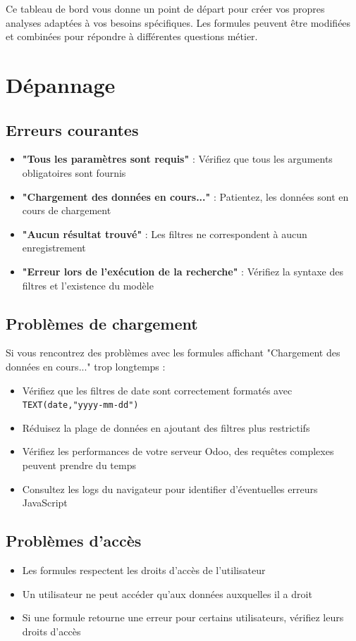 \documentclass[12pt, a4paper]{article}
\begin{document}
Ce tableau de bord vous donne un point de départ pour créer vos propres analyses adaptées à vos besoins spécifiques. Les formules peuvent être modifiées et combinées pour répondre à différentes questions métier.

\section{Dépannage}

\subsection{Erreurs courantes}
\begin{itemize}
    \item \textbf{"Tous les paramètres sont requis"} : Vérifiez que tous les arguments obligatoires sont fournis
    \item \textbf{"Chargement des données en cours..."} : Patientez, les données sont en cours de chargement
    \item \textbf{"Aucun résultat trouvé"} : Les filtres ne correspondent à aucun enregistrement
    \item \textbf{"Erreur lors de l'exécution de la recherche"} : Vérifiez la syntaxe des filtres et l'existence du modèle
\end{itemize}

\subsection{Problèmes de chargement}
Si vous rencontrez des problèmes avec les formules affichant "Chargement des données en cours..." trop longtemps :
\begin{itemize}
    \item Vérifiez que les filtres de date sont correctement formatés avec \texttt{TEXT(date,"yyyy-mm-dd")}
    \item Réduisez la plage de données en ajoutant des filtres plus restrictifs
    \item Vérifiez les performances de votre serveur Odoo, des requêtes complexes peuvent prendre du temps
    \item Consultez les logs du navigateur pour identifier d'éventuelles erreurs JavaScript
\end{itemize}

\subsection{Problèmes d'accès}
\begin{itemize}
    \item Les formules respectent les droits d'accès de l'utilisateur
    \item Un utilisateur ne peut accéder qu'aux données auxquelles il a droit
    \item Si une formule retourne une erreur pour certains utilisateurs, vérifiez leurs droits d'accès
\end{itemize}
\end{document}
